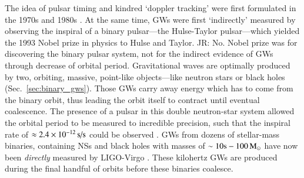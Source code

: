 \documentclass[onecolumn,authoryear]{els-mrw}
\begin{document}
The idea of pulsar timing and kindred `doppler tracking' were first formulated in the 1970s and 1980s \citep{Estabrook+Wahlquist-1975, Sazhin-1978, Detweiler-1979, Hellings+Downs-1983}.  At the same time, GWs were first `indirectly' measured by observing the inspiral of a binary pulsar---the Hulse-Taylor pulsar---which yielded the 1993 Nobel prize in physics to Hulse and Taylor. {\color{red}JR: No.  Nobel prize was for discovering the binary pulsar system, not for the indirect evidence of GWs through decrease of orbital period.}  Gravitational waves are optimally produced by two, orbiting, massive, point-like objects---like neutron stars or black holes (Sec.~\ref{sec:binary_gws}).  Those GWs carry away energy which has to come from the binary orbit, thus leading the orbit itself to contract until eventual coalescence.  The presence of a pulsar in this double neutron-star system allowed the orbital period to be measured to incredible precision, such that the inspiral rate of $\approx 2.4\times\nobreak10^{-12} \, \textrm{s/s}$ could be observed \citep{Weisberg+2010}.  GWs from dozens of stellar-mass binaries, containing NSs and black holes with masses of $\sim 10\rm{s} - 100 \, \textrm{M}_{\odot}$ have now been \textit{directly} measured by LIGO-Virgo \citep{LVK-2023}.  These kilohertz GWs are produced during the final handful of orbits before these binaries coalesce.
\end{document}
